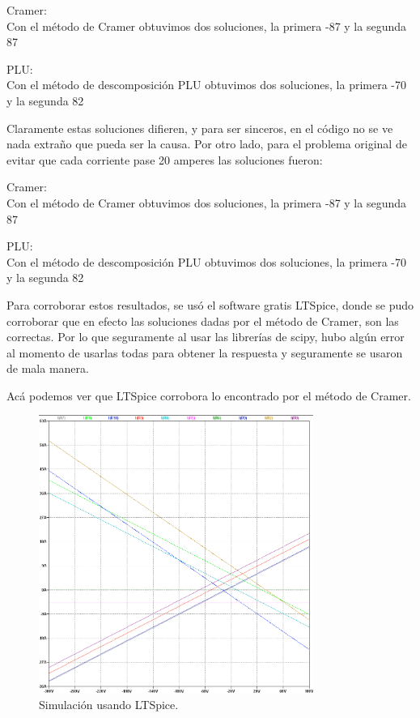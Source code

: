 \documentclass[letter, 11pt]{article}
\begin{document}
Cramer:\\

Con el método de Cramer obtuvimos dos soluciones, la primera -87 y la segunda 87

PLU:\\
Con el método de descomposición PLU obtuvimos dos soluciones, la primera -70 y la segunda 82


Claramente estas soluciones difieren, y para ser sinceros, en el código no se ve nada extraño que pueda ser la causa. Por otro lado, para el problema original de evitar que cada corriente pase 20 amperes las soluciones fueron:


Cramer:\\

Con el método de Cramer obtuvimos dos soluciones, la primera -87 y la segunda 87

PLU:\\
Con el método de descomposición PLU obtuvimos dos soluciones, la primera -70 y la segunda 82

Para corroborar estos resultados, se usó el software gratis LTSpice, donde se pudo corroborar que en efecto las soluciones dadas por el método de Cramer, son las correctas. Por lo que seguramente al usar las librerías de scipy, hubo algún error al momento de usarlas todas para obtener la respuesta y seguramente se usaron de mala manera.

Acá podemos ver que LTSpice corrobora lo encontrado por el método de Cramer.


\begin{figure}[h]
 \centering
 \includegraphics[width=0.8\textwidth]{./img3.png}
 \caption{Simulación usando LTSpice.}
\end{figure}
\end{document}
